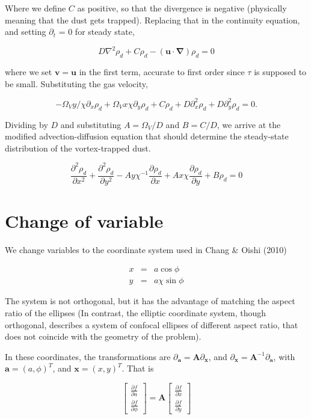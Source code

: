 \documentclass[apj]{emulateapj}
\newcommand{\pderiv}[2]{\frac{\partial #1}{\partial #2}}
\newcommand{\pderivn}[3]{\frac{\partial^{#3} #1}{\partial #2^{#3}}}
\newcommand{\vt}[1]{\mathbf{#1}}       %
\renewcommand{\v}[1]{{\boldsymbol{#1}}} %
\newcommand{\del}{\v{\nabla}}
\newcommand{\Laplace}{\nabla^2}
\newcommand{\beq}{\begin{equation}}
\newcommand{\eeq}{\end{equation}}
\newcommand{\beqn}{\begin{eqnarray}}
\newcommand{\eeqn}{\end{eqnarray}}
\begin{document}
\noindent Where we define $C$ as positive, so that the divergence is negative (physically meaning that the dust gets trapped). Replacing that in the continuity equation, and setting $\partial_t$ =
0 for steady state, 

\beq
D\Laplace{\rho_d} + C\rho_d -  (\v{u}\cdot\del)\rho_d = 0 
\eeq

\noindent where we set $\v{v}=\v{u}$ in the first term, accurate to
first order since $\tau$ is supposed to be small. Substituting the gas velocity,

\beq
   -\Omega_V y / \chi \partial_x \rho_d +  \Omega_V x \chi \partial_y
  \rho_d + C \rho_d  + D\partial_x^2{\rho_d} + D\partial_y^2{\rho_d} = 0.
\eeq

Dividing by $D$ and substituting $A=\varOmega_V/D$ and $B=C/D$, we
arrive at the modified advection-diffusion equation that should
determine the steady-state distribution of the vortex-trapped dust.

\beq
  \pderivn{\rho_d}{x}{2} + \pderivn{\rho_d}{y}{2} - A  y\chi^{-1} \pderiv{\rho_d}{x} +  A x \chi \pderiv{\rho_d}{y} + B \rho_d   = 0 
\eeq


\section{Change of variable}

We change variables to the coordinate system used in Chang \& Oishi (2010)

\beqn
  x &=& a \cos\phi \\
  y &=& a\chi\sin\phi
\eeqn

The system is not orthogonal, but it has the advantage of matching the
aspect ratio of the ellipses (In contrast, the elliptic coordinate
system, though orthogonal, describes a system of confocal ellipses of
different aspect ratio, that does not coincide with the geometry of
the problem). 

In these coordinates, the transformations are $\partial_\v{a} =
\vt{A} \partial_\v{x}$, and $\partial_\v{x} =
\vt{A}^{-1} \partial_\v{a}$, with $\v{a} = (a,\phi)^T$, and $\v{x} =
(x,y)^T$. That is

\beq
\left[\begin{array}{c}
    \pderiv{f}{a}  \\
    \pderiv{f}{\phi}
  \end{array}\right] = \vt{A} 
  \left[\begin{array}{c}
      \pderiv{f}{x}  \\
      \pderiv{f}{y}
    \end{array}\right] 
\eeq
\end{document}
